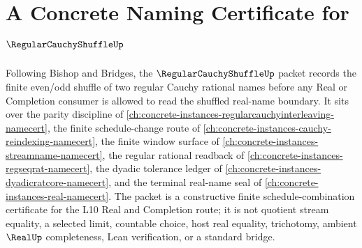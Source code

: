\chapter{A Concrete Naming Certificate for $\RegularCauchyShuffleUp$}
\label{ch:concrete-instances-regular-cauchy-shuffle-namecert}

Following Bishop and Bridges, the $\RegularCauchyShuffleUp$ packet records the finite even/odd shuffle of two regular Cauchy rational names before any Real or Completion consumer is allowed to read the shuffled real-name boundary. It sits over the parity discipline of \autoref{ch:concrete-instances-regularcauchyinterleaving-namecert}, the finite schedule-change route of \autoref{ch:concrete-instances-cauchy-reindexing-namecert}, the finite window surface of \autoref{ch:concrete-instances-streamname-namecert}, the regular rational readback of \autoref{ch:concrete-instances-regseqrat-namecert}, the dyadic tolerance ledger of \autoref{ch:concrete-instances-dyadicratcore-namecert}, and the terminal real-name seal of \autoref{ch:concrete-instances-real-namecert}. The packet is a constructive finite schedule-combination certificate for the L10 Real and Completion route; it is not quotient stream equality, a selected limit, countable choice, host real equality, trichotomy, ambient $\RealUp$ completeness, Lean verification, or a standard bridge.

